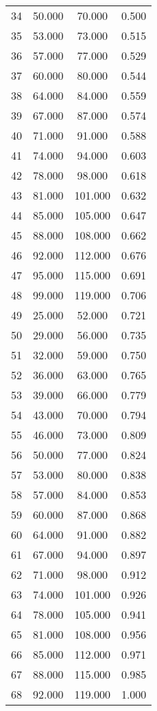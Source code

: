 \begin{tabular}{cccc}
  34 & 50.000 & 70.000 & 0.500 \\ 
  35 & 53.000 & 73.000 & 0.515 \\ 
  36 & 57.000 & 77.000 & 0.529 \\ 
  37 & 60.000 & 80.000 & 0.544 \\ 
  38 & 64.000 & 84.000 & 0.559 \\ 
  39 & 67.000 & 87.000 & 0.574 \\ 
  40 & 71.000 & 91.000 & 0.588 \\ 
  41 & 74.000 & 94.000 & 0.603 \\ 
  42 & 78.000 & 98.000 & 0.618 \\ 
  43 & 81.000 & 101.000 & 0.632 \\ 
  44 & 85.000 & 105.000 & 0.647 \\ 
  45 & 88.000 & 108.000 & 0.662 \\ 
  46 & 92.000 & 112.000 & 0.676 \\ 
  47 & 95.000 & 115.000 & 0.691 \\ 
  48 & 99.000 & 119.000 & 0.706 \\ 
  49 & 25.000 & 52.000 & 0.721 \\ 
  50 & 29.000 & 56.000 & 0.735 \\ 
  51 & 32.000 & 59.000 & 0.750 \\ 
  52 & 36.000 & 63.000 & 0.765 \\ 
  53 & 39.000 & 66.000 & 0.779 \\ 
  54 & 43.000 & 70.000 & 0.794 \\ 
  55 & 46.000 & 73.000 & 0.809 \\ 
  56 & 50.000 & 77.000 & 0.824 \\ 
  57 & 53.000 & 80.000 & 0.838 \\ 
  58 & 57.000 & 84.000 & 0.853 \\ 
  59 & 60.000 & 87.000 & 0.868 \\ 
  60 & 64.000 & 91.000 & 0.882 \\ 
  61 & 67.000 & 94.000 & 0.897 \\ 
  62 & 71.000 & 98.000 & 0.912 \\ 
  63 & 74.000 & 101.000 & 0.926 \\ 
  64 & 78.000 & 105.000 & 0.941 \\ 
  65 & 81.000 & 108.000 & 0.956 \\ 
  66 & 85.000 & 112.000 & 0.971 \\ 
  67 & 88.000 & 115.000 & 0.985 \\ 
  68 & 92.000 & 119.000 & 1.000 \\ 
   \hline
\end{tabular}
